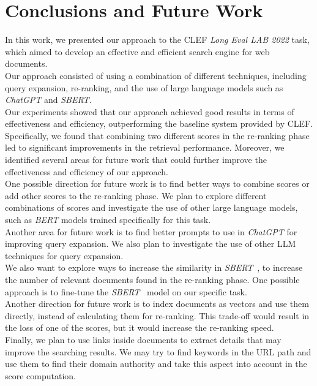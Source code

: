 \newpage
\section{Conclusions and Future Work}
\label{sec:conclusion}
 
In this work, we presented our approach to the \ac{CLEF} \textit{Long Eval LAB 2022} task, which aimed to develop an effective and efficient search engine for web documents. \\
Our approach consisted of using a combination of different techniques, including query expansion, re-ranking, and the use of large language models such as \textit{ChatGPT} and \textit{SBERT}. \\
Our experiments showed that our approach achieved good results in terms of effectiveness and efficiency, outperforming the baseline system provided by \ac{CLEF}. \\
Specifically, we found that combining two different scores in the re-ranking phase led to significant improvements in the retrieval performance. Moreover, we identified several areas for future work that could further improve the effectiveness and efficiency of our approach. \\
One possible direction for future work is to find better ways to combine scores or add other scores to the re-ranking phase. We plan to explore different combinations of scores and investigate the use of other large language models, such as \textit{BERT} models trained specifically for this task. \\
Another area for future work is to find better prompts to use in \textit{ChatGPT} for improving query expansion. We also plan to investigate the use of other \ac{LLM} techniques for query expansion. \\
We also want to explore ways to increase the similarity in \textit{SBERT}~\cite{reimers-2019-sentence-bert}, to increase the number of relevant documents found in the re-ranking phase. One possible approach is to fine-tune the \textit{SBERT}~\cite{reimers-2019-sentence-bert} model on our specific task. \\
Another direction for future work is to index documents as vectors and use them directly, instead of calculating them for re-ranking. This trade-off would result in the loss of one of the scores, but it would increase the re-ranking speed. \\
Finally, we plan to use links inside documents to extract details that may improve the searching results. We may try to find keywords in the URL path and use them to find their domain authority and take this aspect into account in the score computation.
